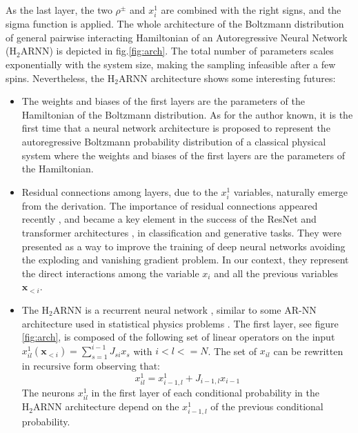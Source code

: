 \documentclass[aps,physrev,10pt,floatfix,reprint]{revtex4-2}
\begin{document}
As the last layer, the two $\rho^{\pm}$ and $x_i^1$ are combined with the right signs, and the sigma function is applied. The whole architecture of the Boltzmann distribution of general pairwise interacting Hamiltonian of an Autoregressive Neural Network ($\text{H}_2\text{ARNN}$) is depicted in fig.\ref{fig:arch}. The total number of parameters scales exponentially with the system size, making the sampling infeasible after a few spins.
Nevertheless, the $\text{H}_2\text{ARNN}$ architecture shows some interesting futures:
\begin{itemize}
    \item The weights and biases of the first layers are the parameters of the Hamiltonian of the Boltzmann distribution.  As for the author known, it is the first time that a neural network architecture is proposed to represent the autoregressive Boltzmann probability distribution of a classical physical system where the weights and biases of the first layers are the parameters of the Hamiltonian. 
    \item Residual connections among layers, due to the $x_i^1$ variables, naturally emerge from the derivation. 
    The importance of residual connections appeared recently \cite{10.48550/arxiv.1512.03385}, and became a key element in the success of the ResNet and transformer architectures \cite{vaswani2017attention}, in classification and generative tasks. They were presented as a way to improve the training of deep neural networks avoiding the exploding and vanishing gradient problem. In our context, they represent the direct interactions among the variable $x_i$ and all the previous variables $\mathbf{x}_{<i}$. 

    \item The $\text{H}_2\text{ARNN}$ is a recurrent neural network \cite{bengioNatureDeepLearning2015, https://doi.org/10.48550/arxiv.1506.00019}, similar to some AR-NN architecture used in statistical physics problems \cite{10.1038/s42256-021-00401-3, PhysRevResearch.2.023358}. 
    The first layer, see figure \ref{fig:arch}, is composed of the following set of linear operators on the input $x^1_{il}(\mathbf{x}_{<i})=\sum_{s=1}^{i-1} J_{si} x_s$ with $i<l<=N$. The set of $x_{il}$ can be rewritten in recursive form observing that:
    \begin{equation}
        x^1_{il} = x^1_{i-1,l} + J_{i-1,l} x_{i-1}
    \end{equation}
    The neurons $x^1_{il}$ in the first layer of each conditional probability in the $\text{H}_2\text{ARNN}$ architecture depend on the $x^1_{i-1,l}$ of the previous conditional probability.
\end{itemize}
\end{document}
